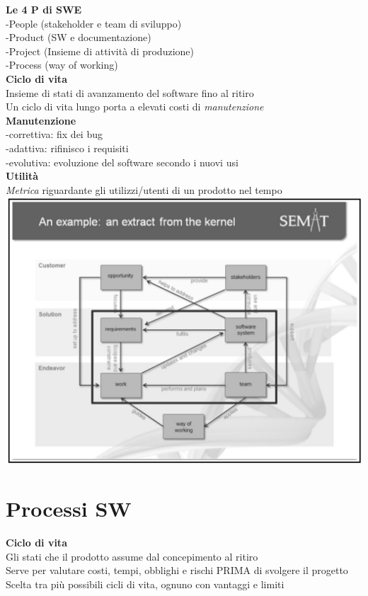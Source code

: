 \documentclass{article}
\begin{document}
		\textbf{Le 4 P di SWE}\\
		-People (stakeholder e team di sviluppo)\\
		-Product (SW e documentazione)\\
		-Project (Insieme di attività di produzione)\\
		-Process (way of working)\\
		
		\textbf{Ciclo di vita}\\
		Insieme di stati di avanzamento del software fino al ritiro\\
		Un ciclo di vita lungo porta a elevati costi di \textit{manutenzione}\\
		
		\textbf{Manutenzione}\\
		-correttiva: fix dei bug\\
		-adattiva: rifinisco i requisiti\\
		-evolutiva: evoluzione del software secondo i nuovi usi\\
		
		\textbf{Utilità}\\
		\textit{Metrica} riguardante gli utilizzi/utenti di un prodotto nel tempo\\
		
		\includegraphics[width=14cm]{semat_org.jpg}\\
		
		
	\clearpage
	\section{Processi SW}
		\textbf{Ciclo di vita}\\
		Gli stati che il prodotto assume dal concepimento al ritiro\\
		Serve per valutare costi, tempi, obblighi e rischi PRIMA di svolgere il progetto\\
		Scelta tra più possibili cicli di vita, ognuno con vantaggi e limiti\\
		
\end{document}
